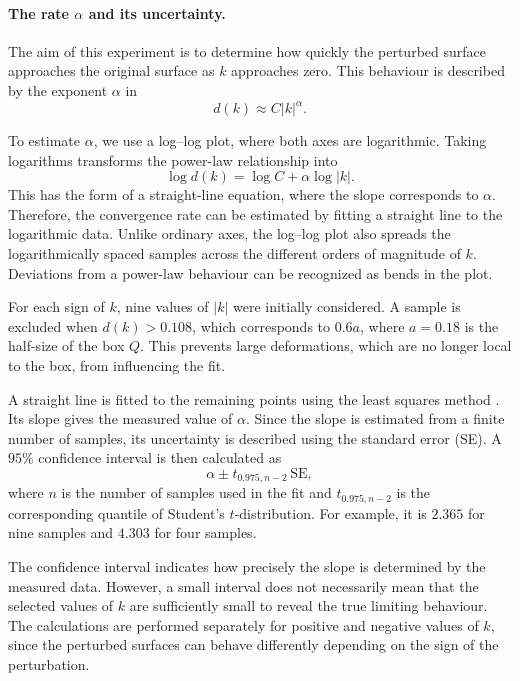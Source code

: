 \documentclass[12pt, a4paper]{article}
\theoremstyle{plain}
\theoremstyle{definition}
\theoremstyle{remark}
\theoremstyle{definition}
\begin{document}
\paragraph{The rate $\alpha$ and its uncertainty.}
The aim of this experiment is to determine how quickly the
perturbed surface approaches the original surface as $k$
approaches zero. This behaviour is described by the exponent
$\alpha$ in
\[
d(k)\approx C|k|^\alpha.
\]

To estimate $\alpha$, we use a log--log plot, where both axes
are logarithmic. Taking logarithms transforms the power-law
relationship into
\[
\log d(k)=\log C+\alpha\log|k|.
\]
This has the form of a straight-line equation, where the slope
corresponds to $\alpha$. Therefore, the convergence rate can
be estimated by fitting a straight line to the logarithmic data.
Unlike ordinary axes, the log--log plot also spreads the
logarithmically spaced samples across the different orders
of magnitude of $k$. Deviations from a power-law behaviour
can be recognized as bends in the plot.

For each sign of $k$, nine values of $|k|$ were initially
considered. A sample is excluded when $d(k)>0.108$, which
corresponds to $0.6a$, where $a=0.18$ is the half-size of the
box $Q$. This prevents large deformations, which are no longer
local to the box, from influencing the fit. 

A straight line is fitted to the remaining points using the
least squares method \cite{draper1998applied}. Its slope gives
the measured value of $\alpha$. Since the slope is estimated
from a finite number of samples, its uncertainty is described
using the standard error (SE). A $95\%$ confidence interval
is then calculated as
\[
\alpha\pm t_{0.975,n-2}\,\mathrm{SE},
\]
where $n$ is the number of samples used in the fit and
$t_{0.975,n-2}$ is the corresponding quantile of Student's
$t$-distribution. For example, it is $2.365$ for nine samples
and $4.303$ for four samples.

The confidence interval indicates how precisely the slope
is determined by the measured data. However, a small interval
does not necessarily mean that the selected values of $k$
are sufficiently small to reveal the true limiting behaviour.
The calculations are performed separately for positive and
negative values of $k$, since the perturbed surfaces can
behave differently depending on the sign of the perturbation.
\end{document}
